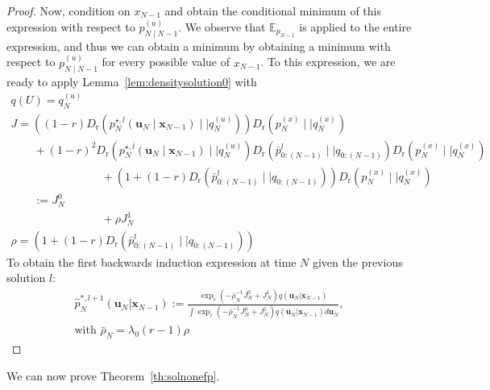 \documentclass[a4paper,fleqn]{cas-sc}
\newcommand{\bv}[1]{\mathbf{#1}}
\newcommand{\Dr}[2]{{D}_{\text{r}}\left(#1\mid \mid #2 \right)}
\newcommand{\shortplant}[1]{p_{{#1}}^{(x)}}
\newcommand{\shortpolicy}[2]{p_{{#1}\mid{#2}}^{(u)}}
\newcommand{\optimalpolicygen}[3]{p^{\star,{#3}}_{{#1}} \left(\bv{u}_{{#1}}\mid \bv{x}_{{#2}} \right)}
\begin{document}
\begin{proof}
Now, condition on $x_{N-1}$ and obtain the conditional minimum of this expression with respect to $\shortpolicy{N}{N-1}$. We observe that $\mathbb{E}_{p_{N-1}}$ is applied to the entire expression, and thus we can obtain a minimum by obtaining a minimum with respect to $\shortpolicy{N}{N-1}$ for every possible value of $x_{N-1}$. To this expression, we are ready to apply Lemma~\ref{lem:densitysolution0} with 
\[
\begin{array}{l}
q(U) = q^{(u)}_N \\
J =  
\left((1-r)\Dr{\optimalpolicygen{N}{N-1}{l}}{q^{(u)}_N}\right)\Dr{\shortplant{N}}{q^{(x)}_N} 
\\ \qquad +(1-r)^2 \Dr{\optimalpolicygen{N}{N-1}{l}}{q^{(u)}_N}\Dr{\bar{p}^{l}_{0:(N-1)}}{q_{0:(N-1)}}\Dr{\shortplant{N}}{q^{(x)}_N} 
\\ \qquad\qquad\qquad \qquad + \left(1+(1-r)\Dr{\bar{p}^{l}_{0:(N-1)}}{q_{0:(N-1)}}\right)\Dr{\shortplant{N}}{q^{(x)}_N}
 \\ \qquad := J_N^0 \\ \qquad\qquad\qquad \qquad + \rho J_N^1 \\ 
\rho = \left(1+ (1-r)\Dr{\bar{p}^{l}_{0:(N-1)}}{q_{0:(N-1)}}\right)
\end{array}
\]
To obtain the first backwards induction expression at time $N$ given the previous solution $l$:
    \begin{equation}\label{eq:backfpsolN}
    \begin{array}{l}
        \hat{p}^{*,l+1}_N(\bv{u}_N\vert\bv{x}_{N-1}):= \frac{\exp_r\left(-\bar{\rho}_N^{-1}J_N^0+J^1_N \right)q(\bv{u}_N\vert \bv{x}_{N-1})}{\int \exp_r\left(-\bar{\rho}_N^{-1}J_N^0+J_N^1 \right)q(\bv{u}_N\vert \bv{x}_{N-1}) d\bv{u}_N},\\
        \text{with } \bar{\rho}_N = \lambda_0(r-1)\rho
        \end{array}
    \end{equation}

\end{proof}

We can now prove Theorem~\ref{th:solnonefp}.
\end{document}
